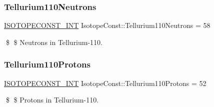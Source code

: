 \subsubsection{\texorpdfstring{Tellurium110\+Neutrons}{Tellurium110Neutrons}}
{\footnotesize\ttfamily \mbox{\hyperlink{group___isotope_const-_macros_ga5f18360b3e99483a35c32d789e62621c}{I\+S\+O\+T\+O\+P\+E\+C\+O\+N\+S\+T\+\_\+\+I\+NT}} Isotope\+Const\+::\+Tellurium110\+Neutrons = 58}

\$ \$ Neutrons in Tellurium-\/110. \mbox{\label{group___isotope_const-_tellurium-_te110_ga9bd1bc17abc9a38879bed26940d9d3d1}} 
\subsubsection{\texorpdfstring{Tellurium110\+Protons}{Tellurium110Protons}}
{\footnotesize\ttfamily \mbox{\hyperlink{group___isotope_const-_macros_ga5f18360b3e99483a35c32d789e62621c}{I\+S\+O\+T\+O\+P\+E\+C\+O\+N\+S\+T\+\_\+\+I\+NT}} Isotope\+Const\+::\+Tellurium110\+Protons = 52}

\$ \$ Protons in Tellurium-\/110. 